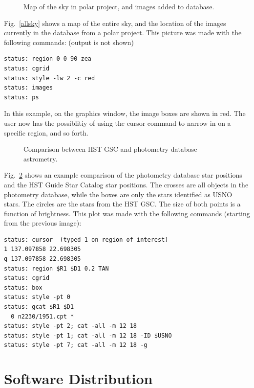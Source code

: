 \documentclass{article}
\begin{document}
\begin{figure}
\caption{\label{polar} \small
  Map of the sky in polar project, and images added to database.  }
\end{figure}

Fig.~\ref{allsky} shows a map of the entire sky, and the location of
the images currently in the database from a polar project.  This
picture was made with the following commands: (output is not shown) \\ 
\begin{verbatim}
status: region 0 0 90 zea
status: cgrid
status: style -lw 2 -c red 
status: images
status: ps
\end{verbatim}
In this example, on the graphics window, the image boxes are shown in
red.  The user now has the possiblitiy of using the cursor command to
narrow in on a specific region, and so forth.  

\begin{figure}
\caption{\label{catalog} \small
  Comparison between HST GSC and photometry database astrometry.  }
\end{figure}

Fig.~\ref{catalog} shows an example comparison of the photometry
database star positions and the HST Guide Star Catalog star positions.
The crosses are all objects in the photometry database, while the
boxes are only the stars identified as USNO stars.  The circles are
the stars from the HST GSC.  The size of both points is a function of
brightness.  This plot was made with the following commands (starting
from the previous image):
\begin{verbatim}
status: cursor  (typed 1 on region of interest)
1 137.097858 22.698305
q 137.097858 22.698305
status: region $R1 $D1 0.2 TAN
status: cgrid
status: box
status: style -pt 0 
status: gcat $R1 $D1 
  0 n2230/1951.cpt *
status: style -pt 2; cat -all -m 12 18
status: style -pt 1; cat -all -m 12 18 -ID $USNO
status: style -pt 7; cat -all -m 12 18 -g
\end{verbatim}

\section{Software Distribution}
\end{document}
